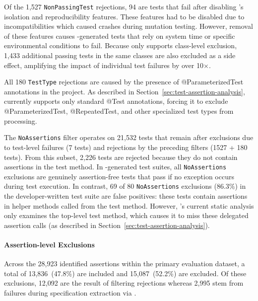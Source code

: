 Of the 1,527 \texttt{NonPassingTest} rejections, 94 are tests that fail
after disabling \ToolEvoSuite{}'s isolation and reproducibility features.
These features had to be disabled due to incompatibilities
which caused \ToolPit{} crashes during mutation testing.
However, removal of these features causes \ToolEvoSuite{}-generated tests that rely on system time or specific environmental conditions to fail.
Because \ToolPit{} only supports class-level exclusion,
1,433 additional passing tests in the same classes are also excluded as a side effect,
amplifying the impact of individual test failures by over 10$\times$.

All 180 \texttt{TestType} rejections are caused by the presence of
@Parameterized\-Test annotations in the \DatasetCommonsDev{} project.
As described in Section~\ref{sec:test-assertion-analysis},
\ToolTeralizer{} currently supports only standard @Test annotations,
forcing it to exclude @ParameterizedTest, @RepeatedTest,
and other specialized test types from processing.

The \texttt{NoAssertions} filter operates on
21,532 tests that remain 
after exclusions due to test-level failures (7 tests)
and rejections by the preceding filters (1527 + 180 tests).
From this subset, 2,226 tests are rejected
because they do not contain assertions in the test method.
In \ToolEvoSuite{}-generated test suites, all \texttt{NoAssertions} exclusions
are genuinely assertion-free tests that pass if no exception occurs during test execution.
In contrast, 69 of 80 \texttt{NoAssertions} exclusions (86.3\%) in the developer-written
\DatasetCommonsDev{} test suite are false positives: these tests
contain assertions in helper methods called from the test method.
However, \ToolTeralizer{}'s current static analysis
only examines the top-level test method,
which causes it to miss these delegated assertion calls
(as described in Section~\ref{sec:test-assertion-analysis}).




\paragraph{Assertion-level Exclusions}
\label{par:assertion-level-exclusions}

Across the 28,923 identified assertions within the primary evaluation dataset,
a total of 13,836~(47.8\%) are included and 15,087~(52.2\%) are excluded.
Of these exclusions, 12,092 are the result of filtering rejections
whereas 2,995 stem from failures during specification extraction via \ToolSPF{}.

